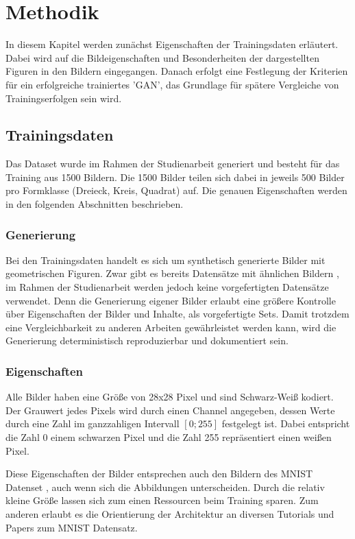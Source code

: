 
\chapter{Methodik}
In diesem Kapitel werden zunächst Eigenschaften der Trainingsdaten erläutert.
Dabei wird auf die Bildeigenschaften und Besonderheiten der dargestellten Figuren in den Bildern eingegangen.
Danach erfolgt eine Festlegung der Kriterien für ein erfolgreiche trainiertes 'GAN', das Grundlage für spätere Vergleiche von Trainingserfolgen sein wird.

\section{Trainingsdaten}
Das Dataset wurde im Rahmen der Studienarbeit generiert und besteht für das Training aus 1500 Bildern.
Die 1500 Bilder teilen sich dabei in jeweils 500 Bilder pro Formklasse (Dreieck, Kreis, Quadrat) auf.
Die genauen Eigenschaften werden in den folgenden Abschnitten beschrieben.

\subsection{Generierung}
Bei den Trainingsdaten handelt es sich um synthetisch generierte Bilder mit geometrischen Figuren. 
Zwar gibt es bereits Datensätze mit ähnlichen Bildern \cite{dataset:2d-geometric-shapes-dataset, dataset:four-shapes}, im Rahmen der Studienarbeit werden jedoch keine vorgefertigten Datensätze verwendet. 
Denn die Generierung eigener Bilder erlaubt eine größere Kontrolle über Eigenschaften der Bilder und Inhalte, als vorgefertigte Sets.
Damit trotzdem eine Vergleichbarkeit zu anderen Arbeiten gewährleistet werden kann, wird die Generierung deterministisch reproduzierbar und dokumentiert sein.

\subsection{Eigenschaften}
Alle Bilder haben eine Größe von 28x28 Pixel und sind Schwarz-Weiß kodiert.
Der Grauwert jedes Pixels wird durch einen Channel angegeben, dessen Werte durch eine Zahl im ganzzahligen Intervall $[0; 255]$ festgelegt ist.
Dabei entspricht die Zahl 0 einem schwarzen Pixel und die Zahl 255 repräsentiert einen weißen Pixel.

Diese Eigenschaften der Bilder entsprechen auch den Bildern des MNIST Datenset \cite{dataset:mnist}, auch wenn sich die Abbildungen unterscheiden.
Durch die relativ kleine Größe lassen sich zum einen Ressourcen beim Training sparen.
Zum anderen erlaubt es die Orientierung der Architektur an diversen Tutorials und Papers zum MNIST Datensatz.
\newline

